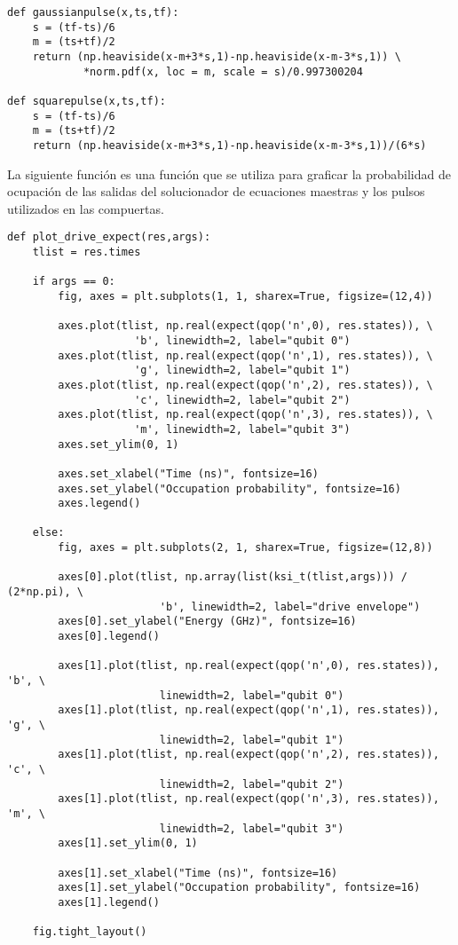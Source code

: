 \begin{verbatim}
def gaussianpulse(x,ts,tf):
    s = (tf-ts)/6
    m = (ts+tf)/2
    return (np.heaviside(x-m+3*s,1)-np.heaviside(x-m-3*s,1)) \
            *norm.pdf(x, loc = m, scale = s)/0.997300204

def squarepulse(x,ts,tf):
    s = (tf-ts)/6
    m = (ts+tf)/2
    return (np.heaviside(x-m+3*s,1)-np.heaviside(x-m-3*s,1))/(6*s)
\end{verbatim}

La siguiente función es una función que se utiliza para graficar la probabilidad de ocupación de las salidas del solucionador de ecuaciones maestras y los pulsos utilizados en las compuertas.

\begin{verbatim}
def plot_drive_expect(res,args):
    tlist = res.times

    if args == 0:
        fig, axes = plt.subplots(1, 1, sharex=True, figsize=(12,4))

        axes.plot(tlist, np.real(expect(qop('n',0), res.states)), \
                    'b', linewidth=2, label="qubit 0")
        axes.plot(tlist, np.real(expect(qop('n',1), res.states)), \
                    'g', linewidth=2, label="qubit 1")
        axes.plot(tlist, np.real(expect(qop('n',2), res.states)), \
                    'c', linewidth=2, label="qubit 2")
        axes.plot(tlist, np.real(expect(qop('n',3), res.states)), \
                    'm', linewidth=2, label="qubit 3")
        axes.set_ylim(0, 1)

        axes.set_xlabel("Time (ns)", fontsize=16)
        axes.set_ylabel("Occupation probability", fontsize=16)
        axes.legend()

    else:
        fig, axes = plt.subplots(2, 1, sharex=True, figsize=(12,8))

        axes[0].plot(tlist, np.array(list(ksi_t(tlist,args))) / (2*np.pi), \
                        'b', linewidth=2, label="drive envelope")
        axes[0].set_ylabel("Energy (GHz)", fontsize=16)
        axes[0].legend()

        axes[1].plot(tlist, np.real(expect(qop('n',0), res.states)), 'b', \
                        linewidth=2, label="qubit 0")
        axes[1].plot(tlist, np.real(expect(qop('n',1), res.states)), 'g', \
                        linewidth=2, label="qubit 1")
        axes[1].plot(tlist, np.real(expect(qop('n',2), res.states)), 'c', \
                        linewidth=2, label="qubit 2")
        axes[1].plot(tlist, np.real(expect(qop('n',3), res.states)), 'm', \
                        linewidth=2, label="qubit 3")
        axes[1].set_ylim(0, 1)

        axes[1].set_xlabel("Time (ns)", fontsize=16)
        axes[1].set_ylabel("Occupation probability", fontsize=16)
        axes[1].legend()

    fig.tight_layout()
\end{verbatim}

